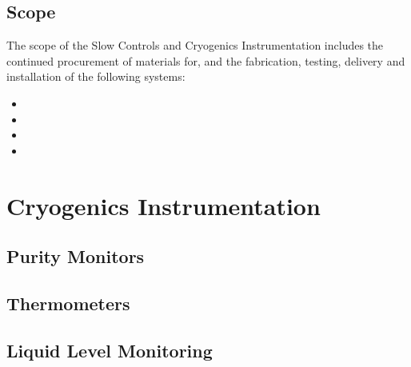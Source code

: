 

\subsection{Scope}
\label{sec:fddp-slow-cryo-scope}

The scope of the Slow Controls and Cryogenics Instrumentation includes the continued procurement of materials for, and the fabrication, testing, delivery and installation of the following systems: 


\begin{itemize}
\item 
\item 
\item  
\item 
\end{itemize}



\section{Cryogenics Instrumentation}
\label{sec:fddp-cryo-instr}




\subsection{Purity Monitors}
\label{sec:fddp-slow-cryo-purity-mon}

\subsection{Thermometers}
\label{sec:fddp-slow-cryo-therm}

\subsection{Liquid Level Monitoring}
\label{sec:fddp-slow-cryo-liiq-lev}


